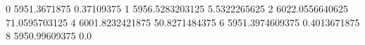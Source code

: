0 5951.3671875 0.37109375
1 5956.5283203125 5.5322265625
2 6022.0556640625 71.0595703125
4 6001.8232421875 50.8271484375
6 5951.3974609375 0.4013671875
8 5950.99609375 0.0
